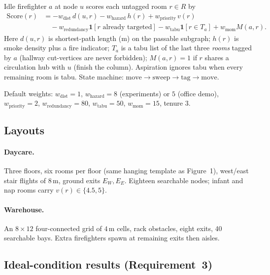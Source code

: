 \documentclass[12pt]{article}
\begin{document}
Idle firefighter \(a\) at node \(u\) scores each untagged room \(r\in R\) by
\begin{equation}
  \label{eq:score}
  \begin{aligned}
  \mathrm{Score}(r)
  &= -w_{\mathrm{dist}}\,d(u,r)
     -w_{\mathrm{hazard}}\,h(r)
     +w_{\mathrm{priority}}\,v(r)\\
  &\quad -w_{\mathrm{redundancy}}\mathbf{1}[r\text{ already targeted}]
     -w_{\mathrm{tabu}}\mathbf{1}[r\in T_a]
     +w_{\mathrm{mom}}M(a,r).
  \end{aligned}
\end{equation}
Here \(d(u,r)\) is shortest-path length (m) on the passable subgraph; \(h(r)\) is
smoke density plus a fire indicator; \(T_a\) is a tabu list of the last three
\emph{rooms} tagged by \(a\) (hallway cut-vertices are never forbidden); \(M(a,r)=1\)
if \(r\) shares a circulation hub with \(u\) (finish the column). Aspiration ignores
tabu when every remaining room is tabu. State machine:
\(\mathrm{move}\to\mathrm{sweep}\to\mathrm{tag}\to\mathrm{move}\).

Default weights:
\(w_{\mathrm{dist}}=1\), \(w_{\mathrm{hazard}}=8\) (experiments) or \(5\) (office demo),
\(w_{\mathrm{priority}}=2\), \(w_{\mathrm{redundancy}}=80\),
\(w_{\mathrm{tabu}}=50\), \(w_{\mathrm{mom}}=15\), tenure \(3\).

\subsection{Layouts}

\paragraph{Daycare.}
Three floors, six rooms per floor (same hanging template as Figure~1), west/east
stair flights of \(8\,\mathrm{m}\), ground exits \(E_W,E_E\). Eighteen searchable
nodes; infant and nap rooms carry \(v(r)\in\{4.5,5\}\).

\paragraph{Warehouse.}
An \(8\times 12\) four-connected grid of \(4\,\mathrm{m}\) cells, rack obstacles,
eight exits, 40 searchable bays. Extra firefighters spawn at remaining exits then
aisles.

\subsection{Ideal-condition results (Requirement~3)}
\end{document}
